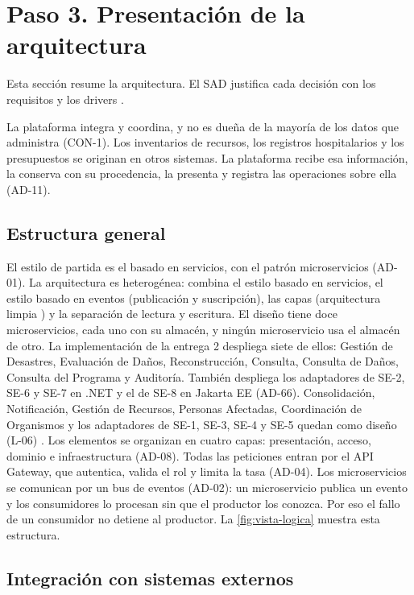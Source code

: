 \documentclass[11pt,letterpaper]{article}
\begin{document}
\section{Paso 3. Presentación de la arquitectura}
\label{sec:paso3}

Esta sección resume la arquitectura. El SAD justifica cada decisión con los requisitos y los drivers
\cite{sad}.

La plataforma integra y coordina, y no es dueña de la mayoría de los datos que administra (CON-1).
Los inventarios de recursos, los registros hospitalarios y los presupuestos se originan en otros
sistemas. La plataforma recibe esa información, la conserva con su procedencia, la presenta y
registra las operaciones sobre ella (AD-11).

\subsection{Estructura general}

El estilo de partida es el basado en servicios, con el patrón microservicios (AD-01). La arquitectura
es heterogénea: combina el estilo basado en servicios, el estilo basado en eventos (publicación y
suscripción), las capas (arquitectura limpia \cite{martin}) y la separación de lectura y escritura.
El diseño tiene doce microservicios, cada uno con su almacén, y ningún microservicio usa el almacén
de otro. La implementación de la entrega 2
despliega siete de ellos: Gestión de Desastres, Evaluación de Daños, Reconstrucción, Consulta,
Consulta de Daños, Consulta del Programa y Auditoría. También despliega los adaptadores de SE-2, SE-6
y SE-7 en .NET y el de SE-8 en Jakarta EE (AD-66). Consolidación, Notificación, Gestión de Recursos,
Personas Afectadas, Coordinación de Organismos y los adaptadores de SE-1, SE-3, SE-4 y SE-5 quedan
como diseño (L-06)
\cite{revision}. Los elementos se organizan en
cuatro capas: presentación, acceso, dominio e infraestructura (AD-08). Todas las peticiones entran
por el API Gateway, que autentica, valida el rol y limita la tasa (AD-04). Los microservicios se
comunican por un bus de eventos (AD-02): un microservicio publica un evento y los consumidores lo
procesan sin que el productor los conozca. Por eso el fallo de un consumidor no detiene al
productor. La \cref{fig:vista-logica} muestra esta estructura.

\subsection{Integración con sistemas externos}
\end{document}
